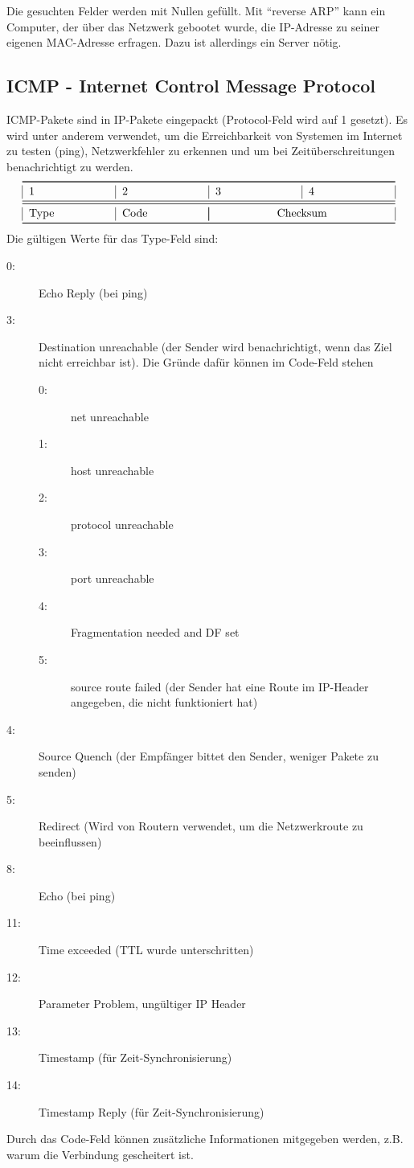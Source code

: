 \documentclass[a4paper,10pt]{scrartcl}
\begin{document}
        Die gesuchten Felder werden mit Nullen gefüllt. Mit “reverse ARP” kann ein Computer, der über das Netzwerk gebootet wurde, die IP-Adresse zu seiner eigenen MAC-Adresse erfragen. Dazu ist allerdings ein Server nötig.
    \subsection{ICMP - Internet Control Message Protocol}
        ICMP-Pakete sind in IP-Pakete eingepackt (Protocol-Feld wird auf 1 gesetzt). Es wird unter anderem verwendet, um  die Erreichbarkeit von Systemen im Internet zu testen (ping), Netzwerkfehler zu erkennen und um bei Zeitüberschreitungen benachrichtigt zu werden.
        \[
            \begin{tabular}{|p{2.5cm}|p{2.5cm}|p{2.5cm}|p{2.5cm}|}    
                \toprule 
                1 & 2 & 3 & 4  \\
                \midrule\midrule
                Type & Code & \multicolumn{2}{|c|}{Checksum}\\
                \bottomrule
            \end{tabular}
        \]
        Die gültigen Werte für das Type-Feld sind:
        \begin{description}
            \item[0:] Echo Reply (bei ping)
            \item[3:] Destination unreachable (der Sender wird benachrichtigt, wenn das Ziel nicht erreichbar ist). Die Gründe dafür können im Code-Feld stehen
            \begin{description}
            \item[0:] net unreachable
            \item[1:] host unreachable
            \item[2:] protocol unreachable
            \item[3:] port unreachable
            \item[4:] Fragmentation needed and DF set
            \item[5:] source route failed (der Sender hat eine Route im IP-Header angegeben, die nicht funktioniert hat)
            \end{description}
            \item[4:] Source Quench (der Empfänger bittet den Sender, weniger Pakete zu senden)
            \item[5:] Redirect (Wird von Routern verwendet, um die Netzwerkroute zu beeinflussen)
            \item[8:] Echo (bei ping)
            \item[11:] Time exceeded (TTL wurde unterschritten)
            \item[12:] Parameter Problem, ungültiger IP Header
            \item[13:] Timestamp (für Zeit-Synchronisierung)
            \item[14:] Timestamp Reply (für Zeit-Synchronisierung)
        \end{description}
        Durch das Code-Feld können zusätzliche Informationen mitgegeben werden, z.B. warum die Verbindung gescheitert ist.
\end{document}
